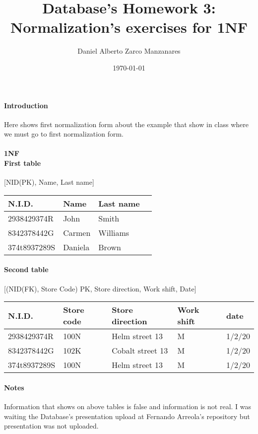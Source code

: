 \documentclass[letterpaper,12pt]{article}
\begin{document}
\title{Database's Homework 3: Normalization's exercises for 1NF}
\author{Daniel Alberto Zarco Manzanares}
\date{\today}
\maketitle
\paragraph{Introduction\\}
Here shows first normalization form about the example that show in class where we must go to first normalization form.
\paragraph{1NF\\First table\\}
[NID(PK), Name, Last name]\\
\begin{tabular}{|l|l|l|l|}
N.I.D. & Name & Last name\\
\hline
2938429374R & John & Smith\\
8342378442G & Carmen & Williams\\
374t8937289S & Daniela & Brown\\
\end{tabular}
\paragraph{Second table\\}
[(NID(FK), Store Code) PK, Store direction, Work shift, Date]\\
\begin{tabular}{|l|l|l|l|l|}
N.I.D. & Store code & Store direction & Work shift & date\\
\hline
2938429374R & 100N & Helm street 13 & M & 1/2/20\\
8342378442G & 102K & Cobalt street 13 & M & 1/2/20\\
374t8937289S & 100N & Helm street 13 & M & 1/2/20\\
\end{tabular}
\paragraph{Notes\\}
Information that shows on above tables is false and information is not real. I was waiting the Database's presentation upload  at Fernando Arreola's repository but presentation was not uploaded.
 
\end{document}

